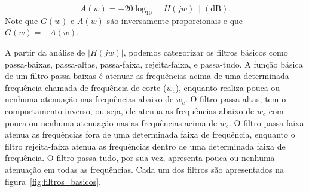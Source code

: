 \begin{equation}
    A(w) = -20 \log_{10} \| H(jw) \| (\text{dB}).
\end{equation}
Note que $G(w)$ e $A(w)$ são inversamente proporcionais e que $G(w) = -A(w)$. 


A partir da análise de $|H(jw)|$, podemos categorizar os filtros básicos como passa-baixas, passa-altas, passa-faixa, rejeita-faixa, e passa-tudo. A função básica de um filtro passa-baixas é atenuar as frequências acima de uma determinada frequência chamada de frequência de corte ($w_c$), enquanto realiza pouca ou nenhuma atenuação nas frequências abaixo de $w_c$. O filtro passa-altas, tem o comportamento inverso, ou seja, ele atenua as frequências abaixo de $w_c$ com pouca ou nenhuma atenuação nas as frequências acima de $w_c$. O filtro passa-faixa atenua as frequências fora de uma determinada faixa de frequência, enquanto o filtro rejeita-faixa atenua as frequências dentro de uma determinada faixa de frequência. O filtro passa-tudo, por sua vez, apresenta pouca ou nenhuma atenuação em todas as frequências. Cada um dos filtros são apresentados na figura~\ref{fig:filtros_basicos}.

